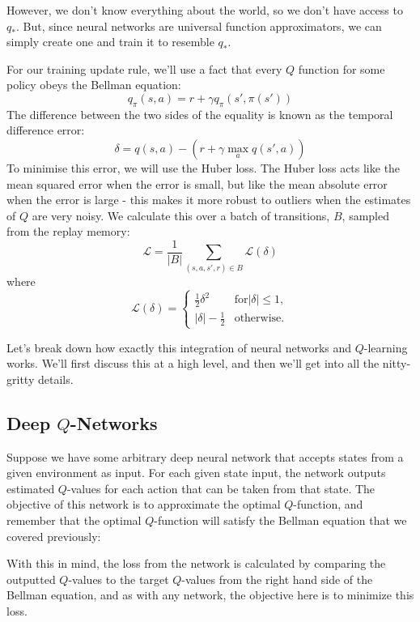 However, we don't know everything about the world, so we don't have access to $q_*$. 
But, since neural networks are universal function approximators, we can simply create 
one and train it to resemble $q_*$.

For our training update rule, we'll use a fact that every $Q$ function for some policy 
obeys the Bellman equation:
$$
q_\pi(s,a) = r + \gamma q_\pi(s', \pi(s'))
$$
\noindent{}The difference between the two sides of the equality is known as the temporal 
difference error:
$$
\delta = q(s,a) - (r + \gamma \max_a q(s', a))
$$
\noindent{}To minimise this error, we will use the Huber loss. The Huber loss acts like 
the mean squared error when the error is small, but like the mean absolute error when 
the error is large - this makes it more robust to outliers when the estimates of $Q$ 
are very noisy. We calculate this over a batch of transitions, $B$, sampled from the 
replay memory:
$$
\mathcal{L} = \frac{1}{|B|} \sum_{(s,a,s',r)\in B} \mathcal{L}(\delta)
$$
\noindent{}where
$$
\mathcal{L}(\delta) = \begin{cases}
\frac{1}{2}\delta^2 &\text{for} |\delta| \leq 1, \\
|\delta| - \frac{1}{2} &\text{otherwise.}
\end{cases}
$$

Let's break down how exactly this integration of neural networks and $Q$-learning works. 
We'll first discuss this at a high level, and then we'll get into all the nitty-gritty 
details.


\subsection{Deep $Q$-Networks}

Suppose we have some arbitrary deep neural network that accepts states from a given 
environment as input. For each given state input, the network outputs estimated $Q$-values 
for each action that can be taken from that state. The objective of this network is to 
approximate the optimal $Q$-function, and remember that the optimal $Q$-function will 
satisfy the Bellman equation that we covered previously:

With this in mind, the loss from the network is calculated by comparing the outputted 
$Q$-values to the target $Q$-values from the right hand side of the Bellman equation, 
and as with any network, the objective here is to minimize this loss.

